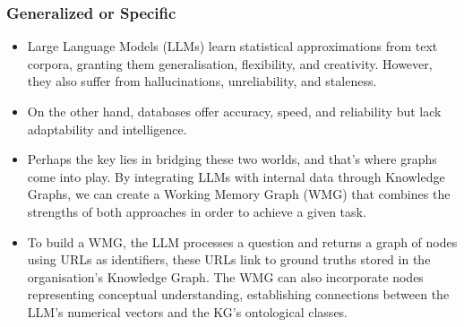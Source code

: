 \begin{frame}[fragile]\frametitle{Generalized or Specific}
\begin{itemize}
\item Large Language Models (LLMs) learn statistical approximations from text corpora, granting them generalisation, flexibility, and creativity. However, they also suffer from hallucinations, unreliability, and staleness.
\item On the other hand, databases offer accuracy, speed, and reliability but lack adaptability and intelligence.
\item Perhaps the key lies in bridging these two worlds, and that's where graphs come into play. By integrating LLMs with internal data through Knowledge Graphs, we can create a Working Memory Graph (WMG) that combines the strengths of both approaches in order to achieve a given task.
\item To build a WMG, the LLM processes a question and returns a graph of nodes using URLs as identifiers, these URLs link to ground truths stored in the organisation's Knowledge Graph. The WMG can also incorporate nodes representing conceptual understanding, establishing connections between the LLM's numerical vectors and the KG's ontological classes.
\end{itemize}
\end{frame}